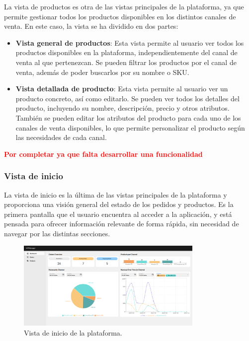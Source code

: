 La vista de productos es otra de las vistas principales de la plataforma, ya que permite gestionar todos los productos disponibles en los distintos canales de venta. En este caso, la vista se ha dividido en dos partes:
\begin{itemize}
    \item \textbf{Vista general de productos}: Esta vista permite al usuario ver todos los productos disponibles en la plataforma, independientemente del canal de venta al que pertenezcan. Se pueden filtrar los productos por el canal de venta, además de poder buscarlos por su nombre o SKU.
    \item \textbf{Vista detallada de producto}: Esta vista permite al usuario ver un producto concreto, así como editarlo. Se pueden ver todos los detalles del producto, incluyendo su nombre, descripción, precio y otros atributos. También se pueden editar los atributos del producto para cada uno de los canales de venta disponibles, lo que permite personalizar el producto según las necesidades de cada canal.
\end{itemize}

\textcolor{red}{\textbf{Por completar ya que falta desarrollar una funcionalidad}}

\subsubsection{Vista de inicio}
\label{dev:subsubsec:vista_inicio}
La vista de inicio es la última de las vistas principales de la plataforma y proporciona una visión general del estado de los pedidos y productos. Es la primera pantalla que el usuario encuentra al acceder a la aplicación, y está pensada para ofrecer información relevante de forma rápida, sin necesidad de navegar por las distintas secciones.

\begin{figure}[H]
    \centering
    \includegraphics[width=0.8\textwidth]{figures/design_develop/screenshots/dashboard.png}
    \caption{Vista de inicio de la plataforma.}
    \label{fig:dev:ss:vista_inicio}
\end{figure}

